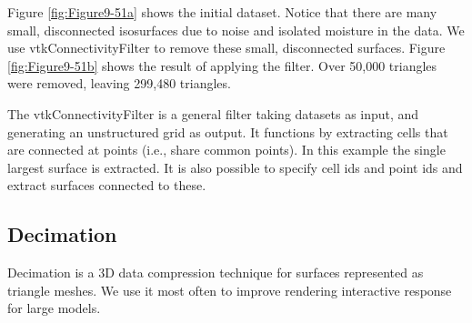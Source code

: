 Figure \ref{fig:Figure9-51a} shows the initial dataset. Notice that there are many small, disconnected isosurfaces due to noise and isolated moisture in the data. We use vtkConnectivityFilter to remove these small, disconnected surfaces. Figure \ref{fig:Figure9-51b} shows the result of applying the filter. Over 50,000 triangles were removed, leaving 299,480 triangles.

The vtkConnectivityFilter is a general filter taking datasets as input, and generating an unstructured grid as output. It functions by extracting cells that are connected at points (i.e., share common points). In this example the single largest surface is extracted. It is also possible to specify cell ids and point ids and extract surfaces connected to these.

\subsection{Decimation}

Decimation is a 3D data compression technique for surfaces represented as triangle meshes. We use it most often to improve rendering interactive response for large models.

